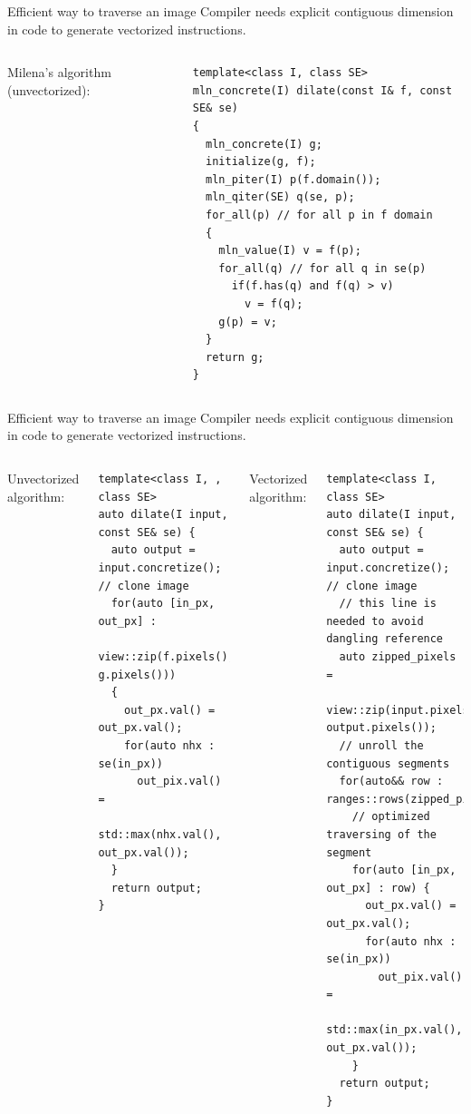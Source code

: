 \documentclass[12pt,aspectratio=169]{beamer}
\begin{document}
\begin{frame}[fragile]{Efficient way to traverse an image}
  Compiler needs explicit contiguous dimension in code to generate vectorized instructions.
  \begin{columns}[T,onlytextwidth]
    Milena's algorithm (unvectorized):
    \begin{verbatim}
template<class I, class SE>
mln_concrete(I) dilate(const I& f, const SE& se)
{
  mln_concrete(I) g;
  initialize(g, f);
  mln_piter(I) p(f.domain());
  mln_qiter(SE) q(se, p);
  for_all(p) // for all p in f domain
  {
    mln_value(I) v = f(p);
    for_all(q) // for all q in se(p)
      if(f.has(q) and f(q) > v)
        v = f(q);
    g(p) = v;
  }
  return g;
}
    \end{verbatim}

  \end{columns}
\end{frame}

\begin{frame}[fragile]{Efficient way to traverse an image}
  Compiler needs explicit contiguous dimension in code to generate vectorized instructions.
  \begin{columns}[T,onlytextwidth]
    Unvectorized algorithm:
    \begin{verbatim}
template<class I, , class SE>
auto dilate(I input, const SE& se) {
  auto output = input.concretize(); // clone image
  for(auto [in_px, out_px] :
        view::zip(f.pixels(), g.pixels()))
  {
    out_px.val() = out_px.val();
    for(auto nhx : se(in_px))
      out_pix.val() =
        std::max(nhx.val(), out_px.val());
  }
  return output;
}
    \end{verbatim}
    Vectorized algorithm:
    \begin{verbatim}
template<class I, class SE>
auto dilate(I input, const SE& se) {
  auto output = input.concretize(); // clone image
  // this line is needed to avoid dangling reference
  auto zipped_pixels =
        view::zip(input.pixels(), output.pixels());
  // unroll the contiguous segments
  for(auto&& row : ranges::rows(zipped_pixels))
    // optimized traversing of the segment
    for(auto [in_px, out_px] : row) {
      out_px.val() = out_px.val();
      for(auto nhx : se(in_px))
        out_pix.val() =
          std::max(in_px.val(), out_px.val());
    }
  return output;
}
    \end{verbatim}
  \end{columns}
\end{frame}
\end{document}
